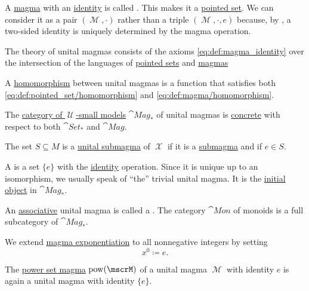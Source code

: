 \begin{definition}\label{def:unital_magma}
  A \hyperref[def:magma]{magma} with an \hyperref[def:magma_identity]{identity} is called . This makes it a \hyperref[def:pointed_set]{pointed set}. We can consider it as a pair \( (\mscrM, \cdot) \) rather than a triple \( (\mscrM, \cdot, e) \) because, by , a two-sided identity is uniquely determined by the magma operation.

  \begin{thmenum}
     The theory of unital magmas consists of the axioms \eqref{eq:def:magma_identity} over the intersection of the languages of \hyperref[def:pointed_set/theory]{pointed sets} and \hyperref[def:magma/theory]{magmas}

     A \hyperref[def:first_order_homomorphism]{homomorphism} between unital magmas is a function that satisfies both \eqref{eq:def:pointed_set/homomorphism} and \eqref{eq:def:magma/homomorphism}.

     The \hyperref[def:category_of_small_first_order_models]{category of \( \mscrU \)-small models} \( \cat{Mag}_* \) of unital magmas is \hyperref[def:concrete_category]{concrete} with respect to both \hyperref[def:pointed_set/category]{\( \cat{Set}_* \)} and \hyperref[def:magma/category]{\( \cat{Mag} \)}.

     The set \( S \subseteq M \) is a \hyperref[def:first_order_substructure]{unital submagma} of \( \mscrX \) if it is a \hyperref[def:magma/substructure]{submagma} and if \( e \in S \).

     A  is a set \( \{ e \} \) with the \hyperref[def:multi_valued_function/identity]{identity} operation. Since it is unique up to an isomorphism, we usually speak of \enquote{the} trivial unital magma. It is the \hyperref[def:universal_objects/initial]{initial object} in \( \cat{Mag}_* \).

     An \hyperref[eq:def:magma/associative]{associative} unital magma is called a . The category \( \cat{Mon} \) of monoids is a full subcategory of \( \cat{Mag}_* \).

     We extend \hyperref[def:magma/exponentiation]{magma exponentiation} to all nonnegative integers by setting
    \begin{equation*}
      x^0 \coloneqq e.
    \end{equation*}

     The \hyperref[def:magma/power_set]{power set magma} \( \pow(\mscrM) \) of a unital magma \( \mscrM \) with identity \( e \) is again a unital magma with identity \( \{ e \} \).
  \end{thmenum}
\end{definition}


